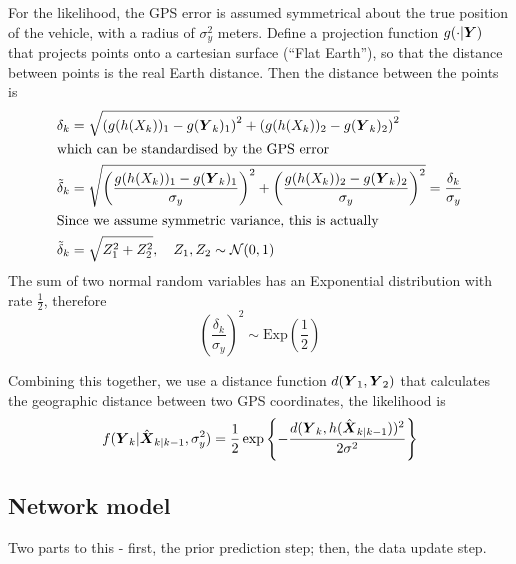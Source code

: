 For the likelihood, the GPS error is assumed symmetrical about the true
position of the vehicle, with a radius of $\sigma_y^2$ meters.
Define a projection function $g(\cdot | \mbox{$\boldsymbol{Y}$})$ that projects points
onto a cartesian surface (``Flat Earth''),
so that the distance between points is the real Earth distance.
Then the distance between the points is
\begin{align*}
\delta_k &= \sqrt{\left(g(h(X_k))_1 - g(\mbox{$\boldsymbol{Y}$}_k)_1\right)^2 +
    \left(g(h(X_k))_2 - g(\mbox{$\boldsymbol{Y}$}_k)_2\right)^2} \\
\intertext{which can be standardised by the GPS error}
\tilde \delta_k &=
\sqrt{\left(\frac{g(h(X_k))_1 - g(\mbox{$\boldsymbol{Y}$}_k)_1}{\sigma_y}\right)^2 +
    \left(\frac{g(h(X_k))_2 - g(\mbox{$\boldsymbol{Y}$}_k)_2}{\sigma_y}\right)^2} =\frac{\delta_k}{\sigma_y} \\
\intertext{Since we assume symmetric variance, this is actually}
\tilde\delta_k &= \sqrt{Z_1^2 + Z_2^2}, \quad
Z_1,Z_2 \sim \mathcal{N}(0,1)
\end{align*}
The sum of two normal random variables has an Exponential distribution with rate $\frac{1}{2}$,
therefore 
\begin{equation}
\label{eq:lhood_exp}
\left(\frac{\delta_k}{\sigma_y}\right)^2 \sim \mathrm{Exp}\left(\frac{1}{2}\right)
\end{equation}

Combining this together, we use a distance function $d(\mbox{$\boldsymbol{Y}$}_1, \mbox{$\boldsymbol{Y}$}_2)$ that calculates
the geographic distance between two GPS coordinates,
the likelihood is
\begin{equation}
\label{eq:lhood}
f(\mbox{$\boldsymbol{Y}$}_k | \hat{\mbox{$\boldsymbol{X}$}}_{k|k-1}, \sigma_y^2) =
\frac{1}{2} \exp\left\{-\frac{d(\mbox{$\boldsymbol{Y}$}_k, h(\hat{\mbox{$\boldsymbol{X}$}}_{k|k-1}))^2}{2\sigma^2}\right\}
\end{equation}


\subsection{Network model}
\label{sec:kf}

Two parts to this - first, the prior prediction step; then, the data update step.
